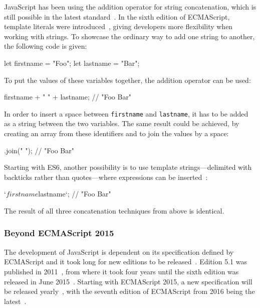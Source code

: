 JavaScript has been using the addition operator for string concatenation, which is still possible in the latest standard~\cite{ES2016SpecOnline:Ecma:2016}. In the sixth edition of ECMAScript, template literals were introduced~\cites[p.~148]{ES6Spec:Ecma:2015}[pp.~47--48]{YDKJS:ES6AndBeyond:Simpson:2015}, giving developers more flexibility when working with strings. To showcase the ordinary way to add one string to another, the following code is given:
\begin{JsCode}[numbers=none]
let firstname = "Foo";
let lastname = "Bar";
\end{JsCode}
To put the values of these variables together, the addition operator can be used:
\begin{JsCode}[numbers=none]
firstname + " " + lastname; // "Foo Bar"
\end{JsCode}
In order to insert a space between \texttt{firstname} and \texttt{lastname}, it has to be added as a string between the two variables. The same result could be achieved, by creating an array from these identifiers and to join the values by a space:
\begin{JsCode}.join(" "); // "Foo Bar"
\end{JsCode}
Starting with ES6, another possibility is to use template strings---delimited with backticks rather than quotes---where expressions can be inserted~\cite[p.~48]{YDKJS:ES6AndBeyond:Simpson:2015}:
\begin{JsCode}[numbers=none]
`${firstname} ${lastname}`; // "Foo Bar"
\end{JsCode}
The result of all three concatenation techniques from above is identical.

\subsubsection{Beyond ECMAScript 2015}

The development of JavaScript is dependent on its specification defined by ECMAScript and it took long for new editions to be released~\cite{ECMA262Archive:Ecma}. Edition 5.1 was published in 2011~\cite{ESSpecOnline:Ecma:2011}, from where it took four years until the sixth edition was released in June 2015~\cite{ES2015SpecOnline:Ecma:2015}. Starting with ECMAScript 2015, a new specification will be released yearly~\cite{ECMAScriptNextSupportInMozilla:Mozilla:2017}, with the seventh edition of ECMAScript from 2016 being the latest~\cites{ECMA262:Ecma:2016}{ES2016SpecOnline:Ecma:2016}.

